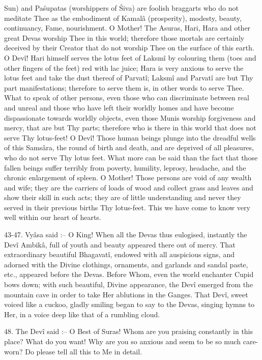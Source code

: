 Sun) and Pa\'supatas (worshippers of \'Siva) are foolish braggarts who do not meditate Thee as the embodiment of Kamal\^a (prosperity), modesty, beauty, continuancy, Fame, nourishment. O Mother! The Asuras, Hari, Hara and other great Devas worship Thee in this world; therefore those mortals are certainly deceived by their Creator that do not worship Thee on the surface of this earth. O Dev\^i! Hari himself serves the lotus feet of Laksm\^i by colouring them (toes and other fingers of the feet) red with lac juice; Hara is very anxious to serve the lotus feet and take the dust thereof of Parvat\^i; Laksm\^i and Parvat\^i are but Thy part manifestations; therefore to serve them is, in other words to serve Thee. What to speak of other persons, even those who can discriminate between real and unreal and those who have left their worldly homes and have become dispassionate towards worldly objects, even those Munis worship forgiveness and mercy, that are but Thy parts; therefore who is there in this world that does not serve Thy lotus-feet! O Dev\^i! Those human beings plunge into the dreadful wells of this Sams\^ara, the round of birth and death, and are deprived of all pleasures, who do not serve Thy lotus feet. What more can be said than the fact that those fallen beings suffer terribly from poverty, humility, leprosy, headache, and the chronic enlargement of spleen. O Mother! Those persons are void of any wealth and wife; they are the carriers of loads of wood and collect grass and leaves and show their skill in such acts; they are of little understanding and never they served in their previous births Thy lotus-feet. This we have come to know very well within our heart of hearts.

43-47. Vy\^asa said :-- O King! When all the Devas thus eulogised, instantly the Dev\^i Ambik\^a, full of youth and beauty appeared there out of mercy. That extraordinary beautiful Bhagavat\^i, endowed with all auspicious signs, and adorned with the Divine clothings, ornaments, and garlands and sandal paste, etc., appeared before the Devas. Before Whom, even the world enchanter Cupid bows down; with such beautiful, Divine appearance, the Dev\^i emerged from the mountain cave in order to take Her ablutions in the Ganges. That Dev\^i, sweet voiced like a cuckoo, gladly smiling began to say to the Devas, singing hymns to Her, in a voice deep like that of a rumbling cloud.

48. The Dev\^i said :-- O Best of Suras! Whom are you praising constantly in this place? What do you want! Why are you so anxious and seem to be so much care-worn? Do please tell all this to Me in detail.

